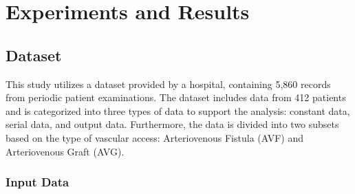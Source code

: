 \chapter{Experiments and Results}
\label{chapter:ref}

\section{Dataset}

This study utilizes a dataset provided by a hospital, containing 5,860 records from periodic patient examinations. The dataset includes data from 412 patients and is categorized into three types of data to support the analysis: constant data, serial data, and output data. Furthermore, the data is divided into two subsets based on the type of vascular access: Arteriovenous Fistula (AVF) and Arteriovenous Graft (AVG).

\subsection{Input Data}

